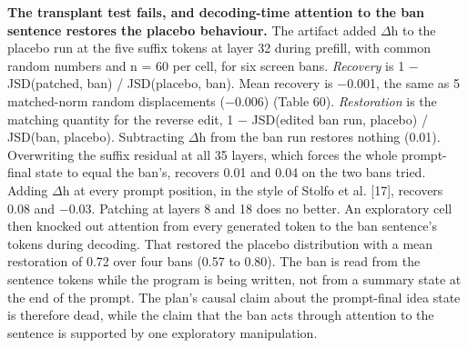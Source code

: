 \documentclass[11pt,letterpaper]{article}
\begin{document}
\textbf{The transplant test fails, and decoding-time attention to the ban sentence restores the placebo behaviour.} The artifact added \ensuremath{\Delta}h to the placebo run at the five suffix tokens at layer 32 during prefill, with common random numbers and n = 60 per cell, for six screen bans. \emph{Recovery} is 1 \ensuremath{-} JSD(patched, ban) / JSD(placebo, ban). Mean recovery is \ensuremath{-}0.001, the same as 5 matched-norm random displacements (\ensuremath{-}0.006) (Table 60). \emph{Restoration} is the matching quantity for the reverse edit, 1 \ensuremath{-} JSD(edited ban run, placebo) / JSD(ban, placebo). Subtracting \ensuremath{\Delta}h from the ban run restores nothing (0.01). Overwriting the suffix residual at all 35 layers, which forces the whole prompt-final state to equal the ban's, recovers 0.01 and 0.04 on the two bans tried. Adding \ensuremath{\Delta}h at every prompt position, in the style of Stolfo et al. [17], recovers 0.08 and \ensuremath{-}0.03. Patching at layers 8 and 18 does no better. An exploratory cell then knocked out attention from every generated token to the ban sentence's tokens during decoding. That restored the placebo distribution with a mean restoration of 0.72 over four bans (0.57 to 0.80). The ban is read from the sentence tokens while the program is being written, not from a summary state at the end of the prompt. The plan's causal claim about the prompt-final idea state is therefore dead, while the claim that the ban acts through attention to the sentence is supported by one exploratory manipulation.
\end{document}
